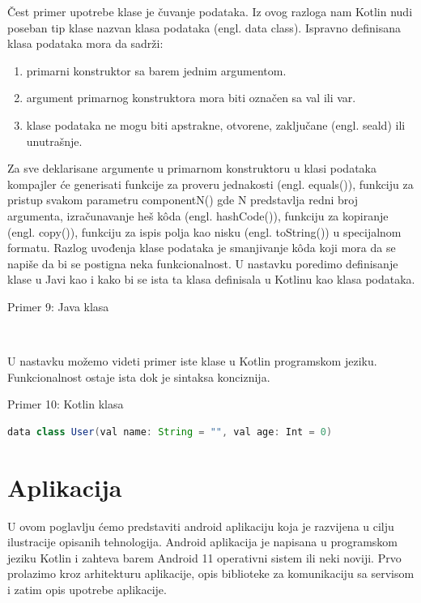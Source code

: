 \documentclass[12pt,oneside]{memoir}
\begin{document}
Čest primer upotrebe klase je čuvanje podataka. Iz ovog razloga nam Kotlin nudi poseban tip klase nazvan klasa podataka (engl. data class). Ispravno definisana klasa podataka mora da sadrži:
\begin{enumerate}
  \item primarni konstruktor sa barem jednim argumentom.
  \item argument primarnog konstruktora mora biti označen sa val ili var.
  \item klase podataka ne mogu biti apstrakne, otvorene, zaključane (engl. seald) ili unutrašnje.
\end{enumerate}


Za sve deklarisane argumente u primarnom konstruktoru u klasi podataka kompajler će generisati funkcije za proveru jednakosti (engl. equals()), funkciju za pristup svakom parametru componentN() gde N predstavlja redni broj argumenta, izračunavanje heš kôda (engl. hashCode()), funkciju za kopiranje (engl. copy()), funkciju za ispis polja kao nisku (engl. toString()) u specijalnom formatu. Razlog uvođenja klase podataka je smanjivanje kôda koji mora da se napiše da bi se postigna neka funkcionalnost. U nastavku poredimo definisanje klase u Javi kao i kako bi se ista ta klasa definisala u Kotlinu kao klasa podataka.

\begin{center} Primer 9: Java klasa\end{center}
\begin{lstlisting}
 
\end{lstlisting}
U nastavku možemo videti primer iste klase u Kotlin programskom jeziku. Funkcionalnost ostaje ista dok je sintaksa konciznija.
\begin{center} Primer 10: Kotlin klasa\end{center}
\begin{lstlisting}[language=Java]
data class User(val name: String = "", val age: Int = 0)
\end{lstlisting}

\section{Aplikacija}
U ovom poglavlju ćemo predstaviti android aplikaciju koja je razvijena u cilju ilustracije opisanih tehnologija. Android aplikacija je napisana u programskom jeziku Kotlin i zahteva barem Android 11 operativni sistem ili neki noviji. Prvo prolazimo kroz arhitekturu aplikacije, opis biblioteke za komunikaciju sa servisom i zatim opis upotrebe aplikacije.
 
\end{document}
